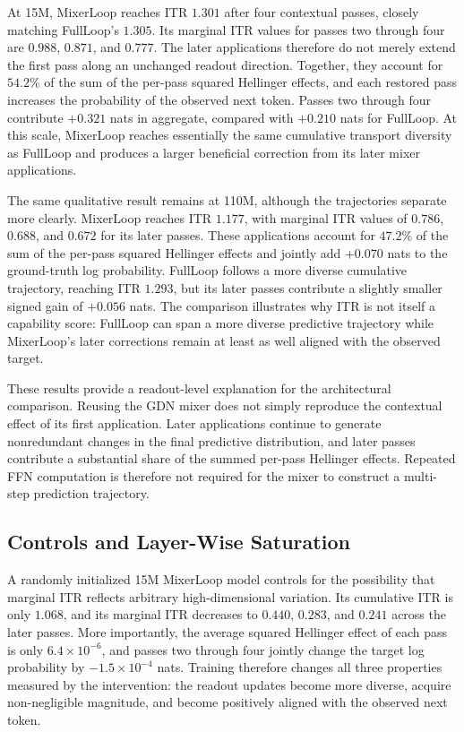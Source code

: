 \documentclass{article}
\begin{document}
At 15M, MixerLoop reaches ITR $1.301$ after four contextual passes, closely
matching FullLoop's $1.305$. Its marginal ITR values for passes two through four
are $0.988$, $0.871$, and $0.777$. The later applications therefore do not
merely extend the first pass along an unchanged readout direction. Together,
they account for $54.2\%$ of the sum of the per-pass squared Hellinger effects,
and each restored pass increases the probability of the observed next token.
Passes two through four contribute $+0.321$ nats in aggregate, compared with
$+0.210$ nats for FullLoop. At this scale, MixerLoop reaches essentially the
same cumulative transport diversity as FullLoop and produces a larger
beneficial correction from its later mixer applications.

The same qualitative result remains at 110M, although the trajectories separate
more clearly. MixerLoop reaches ITR $1.177$, with marginal ITR values of
$0.786$, $0.688$, and $0.672$ for its later passes. These applications account
for $47.2\%$ of the sum of the per-pass squared Hellinger effects and jointly
add $+0.070$ nats to the ground-truth log probability. FullLoop follows a more
diverse cumulative trajectory, reaching ITR $1.293$, but its later passes
contribute a slightly smaller signed gain of $+0.056$ nats. The comparison
illustrates why ITR is not itself a capability score: FullLoop can span a more
diverse predictive trajectory while MixerLoop's later corrections remain at
least as well aligned with the observed target.

These results provide a readout-level explanation for the architectural
comparison. Reusing the GDN mixer does not simply reproduce the contextual
effect of its first application. Later applications continue to generate
nonredundant changes in the final predictive distribution, and later passes
contribute a substantial share of the summed per-pass Hellinger effects.
Repeated FFN computation is therefore not required for the mixer to construct a
multi-step prediction trajectory.

\subsection{Controls and Layer-Wise Saturation}

A randomly initialized 15M MixerLoop model controls for the possibility that
marginal ITR reflects arbitrary high-dimensional variation. Its cumulative ITR
is only $1.068$, and its marginal ITR decreases to $0.440$, $0.283$, and
$0.241$ across the later passes. More importantly, the average squared
Hellinger effect of each pass is only $6.4\times10^{-6}$, and passes two through
four jointly change the target log probability by $-1.5\times10^{-4}$ nats.
Training therefore changes all three properties measured by the intervention:
the readout updates become more diverse, acquire non-negligible magnitude, and
become positively aligned with the observed next token.
\end{document}
